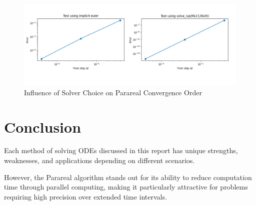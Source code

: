 \documentclass[a4paper,12pt,french]{article}
\begin{document}
\begin{figure}[ht!]
    \centering
    \includegraphics[width=1\textwidth]{img/order_converge.png}
    \caption{Influence of Solver Choice on Parareal Convergence Order}
    \label{fig:9}
\end{figure}
   

%
%




\newpage
\section{Conclusion}
Each method of solving ODEs discussed in this report has unique strengths, weaknesses, and applications depending on different scenarios.

However, the Parareal algorithm stands out for its ability to reduce computation time through parallel computing, making it particularly attractive for problems requiring high precision over extended time intervals.\\
\end{document}
